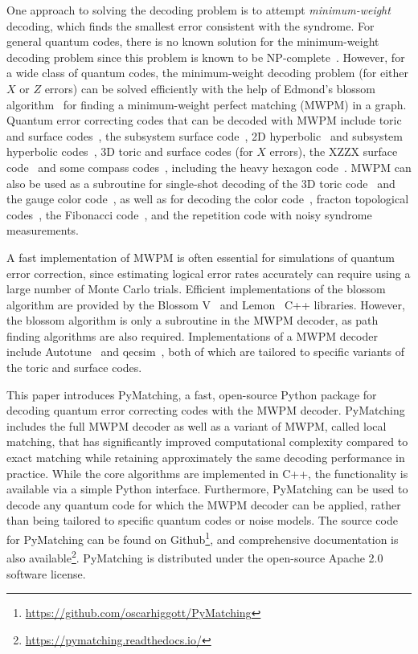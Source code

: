 \documentclass{article}
\begin{document}
One approach to solving the decoding problem is to attempt \textit{minimum-weight} decoding, which finds the smallest error consistent with the syndrome.
For general quantum codes, there is no known solution for the minimum-weight decoding problem since this problem is known to be NP-complete~\cite{hsieh2011np,kuo2012hardness,kuo2020hardnesses,iyer2015hardness}.
However, for a wide class of quantum codes, the minimum-weight decoding problem (for either $X$ or $Z$ errors) can be solved efficiently with the help of Edmond's blossom algorithm~\cite{edmonds1965paths} for finding a minimum-weight perfect matching (MWPM) in a graph.
Quantum error correcting codes that can be decoded with MWPM include toric and surface codes~\cite{dennis2002topological}, the subsystem surface code~\cite{bravyi2012subsystem}, 2D hyperbolic~\cite{breuckmann2016constructions} and subsystem hyperbolic codes~\cite{higgott2020subsystem}, 3D toric and surface codes (for $X$ errors), the XZZX surface code~\cite{bonilla2020xzzx} and some compass codes~\cite{li20192d}, including the heavy hexagon code~\cite{chamberland2020topological}.
MWPM can also be used as a subroutine for single-shot decoding of the 3D toric code~\cite{quintavalle2020single} and the gauge color code~\cite{brown2016fault}, as well as for decoding the color code~\cite{kubica2019efficient}, fracton topological codes~\cite{brown2020parallelized}, the Fibonacci code~\cite{nixon2021correcting}, and the repetition code with noisy syndrome measurements.

A fast implementation of MWPM is often essential for simulations of quantum error correction, since estimating logical error rates accurately can require using a large number of Monte Carlo trials.
Efficient implementations of the blossom algorithm are provided by the Blossom V~\cite{kolmogorov2009blossom} and Lemon~\cite{dezsHo2011lemon} C++ libraries.
However, the blossom algorithm is only a subroutine in the MWPM decoder, as path finding algorithms are also required.
Implementations of a MWPM decoder include Autotune~\cite{fowler2012topological} and qecsim~\cite{qecsim}, both of which are tailored to specific variants of the toric and surface codes.


This paper introduces PyMatching, a fast, open-source Python package for decoding quantum error correcting codes with the MWPM decoder.
PyMatching includes the full MWPM decoder as well as a variant of MWPM, called local matching, that has significantly improved computational complexity compared to exact matching while retaining approximately the same decoding performance in practice.
While the core algorithms are implemented in C++, the functionality is available via a simple Python interface.
Furthermore, PyMatching can be used to decode any quantum code for which the MWPM decoder can be applied, rather than being tailored to specific quantum codes or noise models.
The source code for PyMatching can be found on Github\footnote{\url{https://github.com/oscarhiggott/PyMatching}}, and comprehensive documentation is also available\footnote{\url{https://pymatching.readthedocs.io/}}.
PyMatching is distributed under the open-source Apache 2.0 software license.
\end{document}
